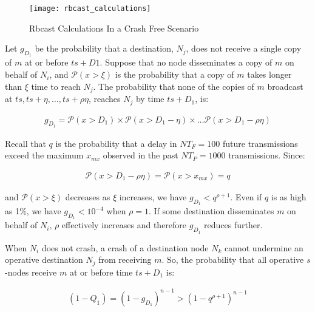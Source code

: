             \begin{figure}[htbp!] 
                \centering    
                \centerline{\texttt{[image: rbcast\_calculations]}}
                \caption[Rbcast Calculations Diagram In a Crash Free Scenario]{Rbcast Calculations In a Crash Free Scenario}
                \label{fig:rbcast_calc}
            \end{figure}	
        
        Let $g_{D_1}$ be the probability that a destination, $N_j$, does not receive a single copy of $m$ at or before $ts + D1$.  Suppose that no node disseminates a copy of $m$ on behalf of $N_i$, and $\mathcal{P}(x > \xi)$ is the probability that a copy of $m$ takes longer than $\xi$ time to reach $N_{j}$.  The probability that none of the copies of $m$ broadcast at $ts, ts+\eta, \ldots,  ts+\rho \eta$, reaches $N_{j}$ by time $ts+D_1$, is:
        
        \begin{equation*}
		    \begin{aligned}
		        g_{D_1}= \mathcal{P}(x > D_1) \times \mathcal{P}(x > D_1 - \eta) \times \ldots \mathcal{P}(x > D_1 - \rho \eta)
		    \end{aligned}
		\end{equation*}

		
		Recall that $q$ is the probability that a delay in $NT_F=100$ future transmissions exceed the maximum $x_{mx}$ observed in the past $NT_P=1000$ transmissions. Since:
        
        \begin{equation*}
		    \begin{aligned}
		        \mathcal{P}(x > D_1 - \rho \eta) = \mathcal{P}(x > x_{mx}) = q
		    \end{aligned}
		\end{equation*}
		
and $\mathcal{P}(x > \xi)$ decreases as $\xi$ increases, we have $g_{D_1} < q^{\rho+1}$.  Even if $q$ is as high as 1\%, we have $g_{D_1} < 10^{-4}$ when $\rho=1$. If some destination disseminates $m$ on behalf of $N_i$, $\rho$ effectively increases and therefore $g_{D_1}$ reduces further.

When $N_i$ does not crash, a crash of a destination node $N_{k}$ cannot undermine an operative destination $N_{j}$ from receiving $m$. So, the probability that all operative $s$-nodes receive $m$ at or before time $ts +D_1$ is:

        \begin{equation*}
		    \begin{aligned}
		        (1-Q_1)=(1-g_{D_1})^{n-1}>(1-q^{\rho+1})^{n-1}
		    \end{aligned}
		\end{equation*}


